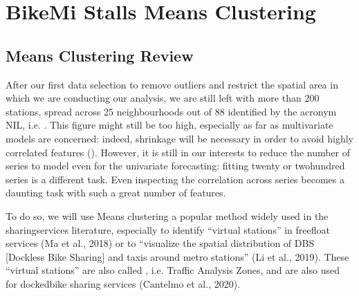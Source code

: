 \documentclass[letterpaper,10pt,english]{jupyterBook}
\begin{document}
\chapter{BikeMi Stalls \sphinxhyphen{}Means Clustering}
\label{\detokenize{04-stations_kmeans:bikemi-stalls-k-means-clustering}}\label{\detokenize{04-stations_kmeans::doc}}

\section{\sphinxhyphen{}Means Clustering Review}
\label{\detokenize{04-stations_kmeans:k-means-clustering-review}}
\sphinxAtStartPar
After our first data selection to remove outliers and restrict the spatial area in which we are conducting our analysis,
we are still left with more than 200 stations, spread across 25 neighbourhoods out of 88 \sphinxhyphen{} identified by the acronym NIL, i.e. . This figure might still be too high, especially as far as multivariate models are concerned: indeed, shrinkage will be necessary in order to avoid highly correlated features ().
However, it is still in our interests to reduce the number of series to model even for the univariate forecasting: fitting twenty or two\sphinxhyphen{}hundred series is a different task. Even inspecting the correlation across series becomes a daunting task with such a great number of features.

\sphinxAtStartPar
To do so, we will use \sphinxhyphen{}Means clustering \sphinxhyphen{} a popular method widely used in the sharing\sphinxhyphen{}services literature, especially to identify “virtual stations” in free\sphinxhyphen{}float services (Ma et al., 2018) or to “visualize the spatial distribution of DBS {[}Dockless Bike Sharing{]} and taxis around metro stations” (Li et al., 2019). These “virtual stations” are also called , i.e. Traffic Analysis Zones, and are also used for docked\sphinxhyphen{}bike sharing services (Cantelmo et al., 2020).
\end{document}
